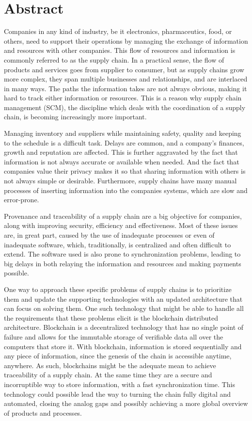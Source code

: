 \chapter{Abstract}
Companies in any kind of industry, be it electronics, pharmaceutics, food, or others, need to support their operations by managing the exchange of information and resources with other companies. This flow of resources and information is commonly referred to as the supply chain. In a practical sense, the flow of products and services goes from supplier to consumer, but as supply chains grow more complex, they span multiple businesses and relationships, and are interlaced in many ways. The paths the information takes are not always obvious, making it hard to track either information or resources. This is a reason why supply chain management (SCM), the discipline which deals with the coordination of a supply chain, is becoming increasingly more important. 

Managing inventory and suppliers while maintaining safety, quality and keeping to the schedule is a difficult task. Delays are common, and a company’s finances, growth and reputation are affected. This is further aggravated by the fact that information is not always accurate or available when needed. And the fact that companies value their privacy makes it so that sharing information with others is not always simple or desirable. Furthermore, supply chains have many manual processes of inserting information into the companies systems, which are slow and error-prone.

Provenance and traceability of a supply chain are a big objective for companies, along with improving security, efficiency and effectiveness. Most of these issues are, in great part, caused by the use of inadequate processes or even of inadequate software, which, traditionally, is centralized and often difficult to extend. The software used is also prone to synchronization problems, leading to big delays in both relaying the information and resources and making payments possible. 

One way to approach these specific problems of supply chains is to prioritize them and update the supporting technologies with an updated architecture that can focus on solving them. One such technology that might be able to handle all the requirements that these problems elicit is the blockchain distributed architecture. Blockchain is a decentralized technology that has no single point of failure and allows for the immutable storage of verifiable data all over the computers that store it. With blockchain, information is stored sequentially and any piece of information, since the genesis of the chain is accessible anytime, anywhere. As such, blockchains might be the adequate mean to achieve traceability of a supply chain. At the same time they are a secure and incorruptible way to store information, with a fast synchronization time. This technology could possible lead the way to turning the chain fully digital and automated, closing the analog gaps and possibly achieving a more global overview of products and processes.

